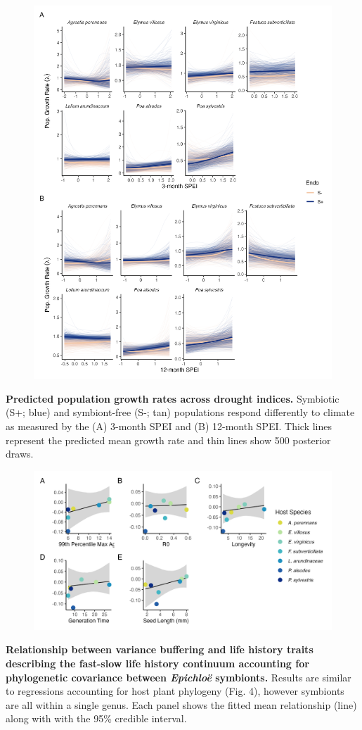 \documentclass[12pt]{article}
\begin{document}
\begin{figure}
	\centering
	\includegraphics[width=.7\linewidth]{spei_combo_lambda_plot.png}
\end{figure}
 \textbf{Predicted population growth rates across drought indices.} Symbiotic (S+; blue) and symbiont-free (S-; tan) populations respond differently to climate as measured by the (A) 3-month SPEI and (B) 12-month SPEI. Thick lines represent the predicted mean growth rate and thin lines show 500 posterior draws.
\newpage


\begin{figure}
	\centering
	\includegraphics[width=\linewidth]{lh_epichloe_plot.png}
\end{figure}
 \textbf{Relationship between variance buffering and life history traits describing the fast-slow life history continuum accounting for phylogenetic covariance between \emph{Epichlo\"{e}} symbionts.} Results are similar to regressions accounting for host plant phylogeny (Fig. 4), however symbionts are all within a single genus. Each panel shows the fitted mean relationship (line) along with with the 95\% credible interval.
\newpage
\end{document}
